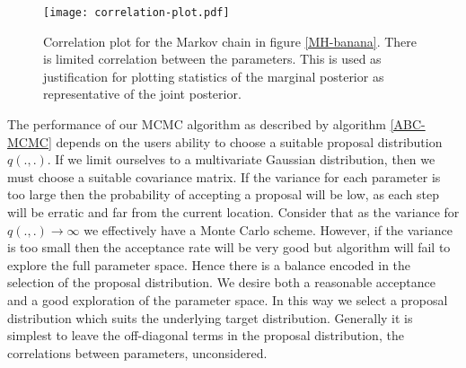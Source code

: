 \begin{figure}[H]
	\centering
	\texttt{[image: correlation-plot.pdf]}
	\caption{Correlation plot for the Markov chain in figure \ref{MH-banana}. There is limited correlation between the parameters. This is used as justification for plotting statistics of the marginal posterior as representative of the joint posterior.}
	\label{correlation-plot}
\end{figure}


The performance of our MCMC algorithm as described by algorithm \ref{ABC-MCMC} depends on the users ability to choose a suitable proposal distribution $q(.,.)$. If we limit ourselves to a multivariate Gaussian distribution, then we must choose a suitable covariance matrix. If the variance for each parameter is too large then the probability of accepting a proposal will be low, as each step will be erratic and far from the current location. Consider that as the variance for $q(.,.) \rightarrow \infty$ we effectively have a Monte Carlo scheme. However, if the variance is too small then the acceptance rate will be very good but algorithm will fail to explore the full parameter space. Hence there is a balance encoded in the selection of the proposal distribution. We desire both a reasonable acceptance and a good exploration of the parameter space. In this way we select a proposal distribution which suits the underlying target distribution. Generally it is simplest to leave the off-diagonal terms in the proposal distribution, the correlations between parameters, unconsidered.\\

